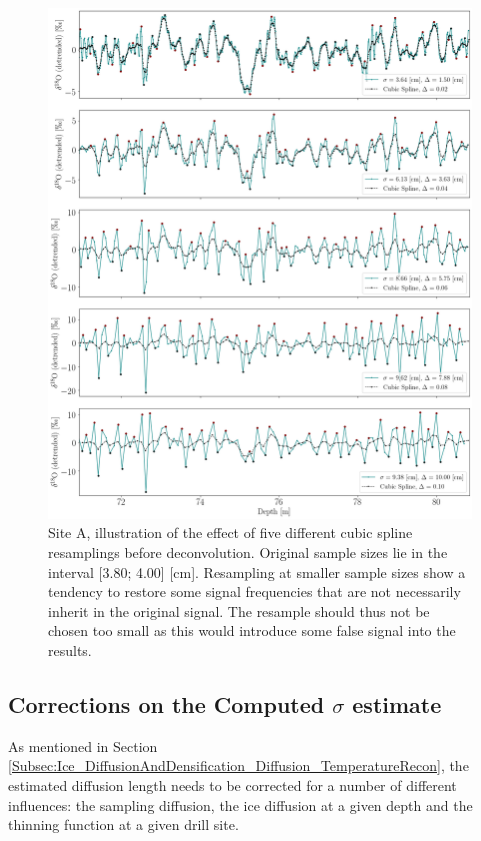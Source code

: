 \documentclass[../../CompleteThesis2/Complete_2ndDraft]{subfiles}
\begin{document}
\begin{figure}[h]
	\centering
	\includegraphics[width=\textwidth]{SiteA_InterpBF_SpecificResamplings.png}
	\caption[Back diffused data, Site A, different resamplings before deconvolution.]{\small Site A, illustration of the effect of five different cubic spline resamplings before deconvolution. Original sample sizes lie in the interval [3.80; 4.00] [cm]. Resampling at smaller sample sizes show a tendency to restore some signal frequencies that are not necessarily inherit in the original signal. The resample should thus not be chosen too small as this would introduce some false signal into the results.}
	\label{Fig:COMPMETH_SiteA_interpBF_SpecificSamplings}
\end{figure}




\subsection[Corrections on $\sigma$][Corrections on $\sigma$]{Corrections on the Computed $\sigma$ estimate}
\label{Subsec:Method_SigmaMethod_SigmaCorrections}
As mentioned in Section \ref{Subsec:Ice_DiffusionAndDensification_Diffusion_TemperatureRecon}, the estimated diffusion length needs to be corrected for a number of different influences: the sampling diffusion, the ice diffusion at a given depth and the thinning function at a given drill site.
\end{document}
